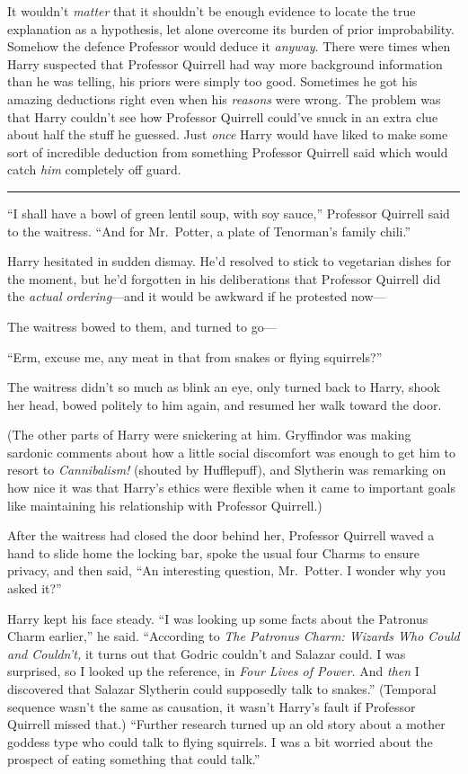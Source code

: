 It wouldn't \emph{matter} that it shouldn't be enough evidence to locate
the true explanation as a hypothesis, let alone overcome its burden of
prior improbability. Somehow the defence Professor would deduce it
\emph{anyway}. There were times when Harry suspected that Professor
Quirrell had way more background information than he was telling, his
priors were simply too good. Sometimes he got his amazing deductions
right even when his \emph{reasons} were wrong. The problem was that
Harry couldn't see how Professor Quirrell could've snuck in an extra
clue about half the stuff he guessed. Just \emph{once} Harry would have
liked to make some sort of incredible deduction from something Professor
Quirrell said which would catch \emph{him} completely off guard.

\begin{center}\rule{3in}{0.4pt}\end{center}

``I shall have a bowl of green lentil soup, with soy sauce,'' Professor
Quirrell said to the waitress. ``And for Mr.~Potter, a plate of
Tenorman's family chili.''

Harry hesitated in sudden dismay. He'd resolved to stick to vegetarian
dishes for the moment, but he'd forgotten in his deliberations that
Professor Quirrell did the \emph{actual ordering}---and it would be
awkward if he protested now---

The waitress bowed to them, and turned to go---

``Erm, excuse me, any meat in that from snakes or flying squirrels?''

The waitress didn't so much as blink an eye, only turned back to Harry,
shook her head, bowed politely to him again, and resumed her walk toward
the door.

(The other parts of Harry were snickering at him. Gryffindor was making
sardonic comments about how a little social discomfort was enough to get
him to resort to \emph{Cannibalism!} (shouted by Hufflepuff), and
Slytherin was remarking on how nice it was that Harry's ethics were
flexible when it came to important goals like maintaining his
relationship with Professor Quirrell.)

After the waitress had closed the door behind her, Professor Quirrell
waved a hand to slide home the locking bar, spoke the usual four Charms
to ensure privacy, and then said, ``An interesting question, Mr.~Potter.
I wonder why you asked it?''

Harry kept his face steady. ``I was looking up some facts about the
Patronus Charm earlier,'' he said. ``According to \emph{The Patronus
Charm: Wizards Who Could and Couldn't,} it turns out that Godric
couldn't and Salazar could. I was surprised, so I looked up the
reference, in \emph{Four Lives of Power.} And \emph{then} I discovered
that Salazar Slytherin could supposedly talk to snakes.'' (Temporal
sequence wasn't the same as causation, it wasn't Harry's fault if
Professor Quirrell missed that.) ``Further research turned up an old
story about a mother goddess type who could talk to flying squirrels. I
was a bit worried about the prospect of eating something that could
talk.''

